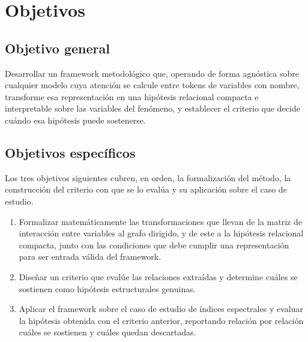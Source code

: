 
\chapter{Objetivos}
\label{cap:objetivos}

\section{Objetivo general}

Desarrollar un framework metodológico que, operando de forma agnóstica sobre cualquier modelo cuya atención se calcule entre tokens de variables con nombre, transforme esa representación en una hipótesis relacional compacta e interpretable sobre las variables del fenómeno, y establecer el criterio que decide cuándo esa hipótesis puede sostenerse.

\section{Objetivos específicos}

Los tres objetivos siguientes cubren, en orden, la formalización del método, la construcción del criterio con que se lo evalúa y su aplicación sobre el caso de estudio.

\begin{enumerate}
\item Formalizar matemáticamente las transformaciones que llevan de la matriz de interacción entre variables al grafo dirigido, y de este a la hipótesis relacional compacta, junto con las condiciones que debe cumplir una representación para ser entrada válida del framework.

\item Diseñar un criterio que evalúe las relaciones extraídas y determine cuáles se sostienen como hipótesis estructurales genuinas.

\item Aplicar el framework sobre el caso de estudio de índices espectrales y evaluar la hipótesis obtenida con el criterio anterior, reportando relación por relación cuáles se sostienen y cuáles quedan descartadas.
\end{enumerate}
